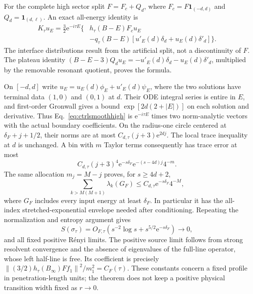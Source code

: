 \documentclass[aps,pra,reprint,superscriptaddress,longbibliography]{revtex4-2}
\newcommand{\ee}{\mathrm e}
\newcommand{\norm}[1]{\left\lVert#1\right\rVert}
\newcommand{\one}{\mathbf 1}
\begin{document}
For the complete high sector split $F=F_c+Q_d$, where
$F_c=F\one_{(-d,d)}$ and $Q_d=\one_{(d,\ell)}$.
An exact all-energy identity is
\begin{align}
 K_\tau u_E=\frac32\ee^{-i\tau E}\bigl\{
 &h_\tau(B-E)F_cu_E\nonumber\\[-2pt]
 &-q_\tau(B-E)[u'_E(d)\delta_d+u_E(d)\delta'_d]\bigr\}.
                                                        \label{eq:ctrlsmoothhigh}
\end{align}
The interface distributions result from the artificial split, not a
discontinuity of $F$. The plateau identity
$(B-E-3)Q_du_E=-u'_E(d)\delta_d-u_E(d)\delta'_d$, multiplied
by the removable resonant quotient, proves the formula.

On $[-d,d]$ write
$u_E=u_E(d)\phi_E+u'_E(d)\psi_E$, where the two solutions have
terminal data $(1,0)$ and $(0,1)$ at $d$. Their ODE integral
series is entire in $E$, and first-order Gronwall gives a bound
$\exp[2d(2+|E|)]$ on each solution and derivative.
Thus Eq.~\eqref{eq:ctrlsmoothhigh} is $\ee^{-i\tau E}$ times
two norm-analytic vectors with the actual boundary coefficients.
On the radius-one circle centered at $\delta_F+j+1/2$, their
norms are at most $C_{d,\tau}(j+3)\ee^{2dj}$.
The local trace inequality at $d$ is unchanged. A bin with $m$
Taylor terms consequently has trace error at most
\begin{equation}
 C_{d,\tau}(j+3)^4\ee^{-s\delta_F}
                     \ee^{-(s-4d)j}4^{-m}.              \label{eq:ctrlsmoothbin}
\end{equation}
The same allocation $m_j=M-j$ proves, for $s\ge4d+2$,
\begin{equation}
 \sum_{k>M(M+1)}\lambda_k(G_F)
       \le C_{d,\tau}\ee^{-s\delta_F}4^{-M},             \label{eq:ctrlsmoothtail}
\end{equation}
where $G_F$ includes every input energy at least $\delta_F$.
In particular it has the all-index stretched-exponential envelope
needed after conditioning. Repeating the normalization and entropy
argument gives
\begin{equation}
 S(\sigma_\tau)=O_{F,\tau}
       (s^{-2}\log s+s^{5/2}\ee^{-s\delta_F})\to0,        \label{eq:ctrlsmoothentropy}
\end{equation}
and all fixed positive R\'enyi limits.
The positive source limit follows from strong resolvent convergence
and the absence of eigenvalues of the full-line operator, whose
left half-line is free. Its coefficient is precisely
$\norm{(3/2)h_\tau(B_\infty)Ff_1}^2/m_1^2=C_F(\tau)$.
These constants concern a fixed profile in penetration-length
units; the theorem does not keep a positive physical transition
width fixed as $r\to0$.
\end{document}
